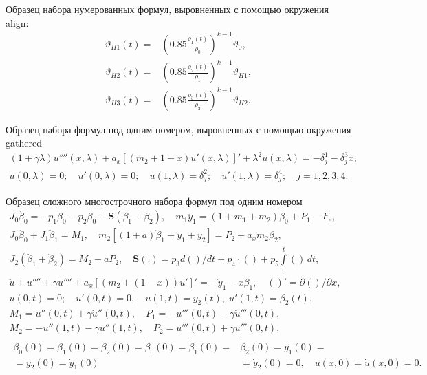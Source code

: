 \documentclass[10pt]{article}
\begin{document}
Образец набора нумерованных формул, выровненных с помощью окружения align:
\begin{align}
	\vartheta_{H1}(t) ={}& \left(0.85 \frac{\rho_1(t)}{\rho_0}\right)^{k - 1} \vartheta_0, \label{eq:al1}\\
	\vartheta_{H2}(t) ={}& \left(0.85 \frac{\rho_2(t)}{\rho_1}\right)^{k - 1} \vartheta_{H1}, \label{eq:al2}\\
	\vartheta_{H3}(t) ={}& \left(0.85 \frac{\rho_3(t)}{\rho_2}\right)^{k - 1} \vartheta_{H2}. \label{eq:al3}
\end{align}

Образец набора формул под одним номером, выровненных с помощью окружения gathered
\begin{equation}\label{eq:gather1}
    \begin{gathered}
        (1 + \gamma \lambda )u''''(x,\lambda ) +
        {a_x}[({m_2} + 1 - x)u'(x,\lambda )]' +
        {\lambda ^2}u(x,\lambda ) =  - \delta _j^1 - \delta _j^3x, \\
        u(0,\lambda ) = 0;\quad
        u'(0,\lambda ) = 0;\quad
        u(1,\lambda ) = \delta _j^2;\quad
        u'(1,\lambda ) = \delta _j^4;\quad
        j = 1,2,3,4.
    \end{gathered}
\end{equation}

Образец сложного многострочного набора формул под одним номером
\begin{equation}\label{eq:complex1}
\begin{gathered}
J_0\ddot\beta_0 = - p_1\dot\beta_0 - p_2\beta _0 + \mathbf{S}(\beta _1 + \beta_2),\quad
   m_1\ddot y_1 = (1 + m_1 + m_2)\beta_0 + P_1 - F_e,\\
J_0\ddot\beta_0 + J_1\ddot\beta_1 = M_1,\quad
  m_2[(1 + a)\ddot\beta_1 + \ddot y_1 + \ddot y_2] = P_2 + a_x m_2\beta_2,\\
J_2(\ddot\beta_1 + \ddot\beta_2) = M_2 - a P_2,\quad
  \mathbf{S}(.) = p_3d()/dt + p_4 \cdot () + p_5\int\limits_0^t ()\,dt, \\
\ddot u + u'''' + \gamma \dot u'''' + a_x[(m_2 + (1 - x))u']' =  - \ddot y_1 - x\ddot\beta_1,\quad
  ()' = \partial ()/\partial x,\\
u(0,t) = 0;\quad
u'(0,t) = 0,\quad
u(1,t) = y_2(t),\; u'(1,t) = \beta_2(t),\\
M_1 = u''(0,t) + \gamma \dot u''(0,t), \quad
P_1 = - u'''(0,t) - \gamma \dot u'''(0,t),\\
M_2 = - u''(1,t) - \gamma \dot u''(1,t),\quad
  P_2 = u'''(0,t) + \gamma \dot u'''(0,t),\\
\begin{split}
\beta_0(0) = \beta_1(0) = \beta_2(0) = \dot\beta_0(0) = \dot\beta_1(0) ={}& \dot\beta_2(0) = y_1(0) = \\
        {} = y_2(0) = \dot y_1(0) & {} = \dot y_2(0) = 0,\quad u(x,0) = \dot u(x,0) = 0.
\end{split}
\end{gathered}
\end{equation}
\end{document}
